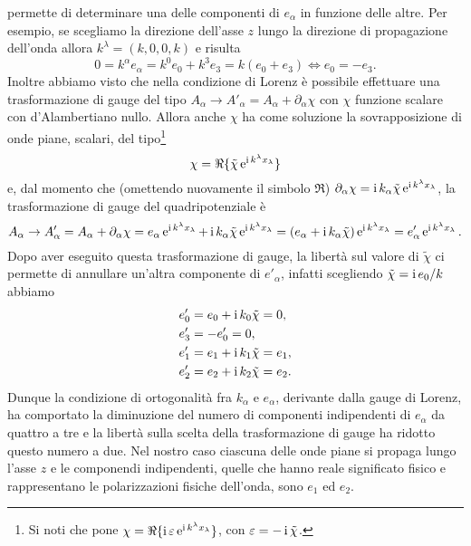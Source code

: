 permette di determinare una delle componenti di $e_{\alpha}$ in funzione delle
altre.  Per esempio, se scegliamo la direzione dell'asse $z$ lungo la direzione
di propagazione dell'onda allora $k^{\lambda} = (k, 0, 0, k)$ e risulta
\begin{equation}
  0 = k^{\alpha} e_{\alpha} = k^{0}e_{0} + k^{3}e_{3} = k(e_{0} + e_{3}) \iff
  e_{0} = -e_{3}.
\end{equation}
Inoltre abbiamo visto che nella condizione di Lorenz è possibile effettuare una
trasformazione di gauge del tipo
$A_{\alpha} \to A'_{\alpha} = A_{\alpha} + \partial_{\alpha}\chi$ con $\chi$
funzione scalare con d'Alambertiano nullo.  Allora anche $\chi$ ha come
soluzione la sovrapposizione di onde piane, scalari, del
tipo\footnote{Si noti che \textcite[258]{weinberg:gravitation} pone
  $\chi = \Re \{\operatorname{\mathrm{i}} \varepsilon\operatorname{\mathrm{e}}^{\operatorname{\mathrm{i}} k^{\lambda}x_{\lambda}}\}$, con
  $\varepsilon = -\operatorname{\mathrm{i}} \tilde{\chi}$.}
\begin{equation}
  \chi = \Re \{\tilde{\chi} \operatorname{\mathrm{e}}^{\operatorname{\mathrm{i}} k^{\lambda}x_{\lambda}}\}
\end{equation}
e, dal momento che (omettendo nuovamente il simbolo $\Re$)
$\partial_{\alpha} \chi = \operatorname{\mathrm{i}} k_{\alpha}
\tilde{\chi}\operatorname{\mathrm{e}}^{\operatorname{\mathrm{i}} k^{\lambda}x_{\lambda}}$,
la trasformazione di gauge del quadripotenziale è
\begin{equation}
  A_{\alpha} \to A'_{\alpha} = A_{\alpha} + \partial_{\alpha}\chi = e_{\alpha}
  \operatorname{\mathrm{e}}^{\operatorname{\mathrm{i}} k^{\lambda}x_{\lambda}} + \operatorname{\mathrm{i}} k_{\alpha}  \tilde{\chi}\operatorname{\mathrm{e}}^{\operatorname{\mathrm{i}}
    k^{\lambda}x_{\lambda}} = (e_{\alpha} + \operatorname{\mathrm{i}} k_{\alpha}
  \tilde{\chi})\operatorname{\mathrm{e}}^{\operatorname{\mathrm{i}} k^{\lambda}x_{\lambda}} = e'_{\alpha}\operatorname{\mathrm{e}}^{\operatorname{\mathrm{i}}
    k^{\lambda}x_{\lambda}}.
\end{equation}
Dopo aver eseguito questa trasformazione di gauge, la libertà sul valore di
$\tilde{\chi}$ ci permette di annullare un'altra componente di $e'_{\alpha}$,
infatti scegliendo $\tilde{\chi} = \operatorname{\mathrm{i}} e_{0}/k$ abbiamo
\begin{subequations}
  \begin{align}
    e'_{0} &= e_{0} + \operatorname{\mathrm{i}} k_{0} \tilde{\chi} = 0, \\
    e'_{3} &= -e'_{0} = 0, \\
    e'_{1} &= e_{1} + \operatorname{\mathrm{i}} k_{1} \tilde{\chi} = e_{1}, \\
    e'_{2} &= e_{2} + \operatorname{\mathrm{i}} k_{2} \tilde{\chi} = e_{2}.
  \end{align}
\end{subequations}
Dunque la condizione di ortogonalità fra $k_{\alpha}$ e $e_{\alpha}$, derivante
dalla gauge di Lorenz, ha comportato la diminuzione del numero di componenti
indipendenti di $e_{\alpha}$ da quattro a tre e la libertà sulla scelta della
trasformazione di gauge ha ridotto questo numero a due.  Nel nostro caso
ciascuna delle onde piane si propaga lungo l'asse $z$ e le componendi
indipendenti, quelle che hanno reale significato fisico e rappresentano le
polarizzazioni fisiche dell'onda, sono $e_{1}$ ed $e_{2}$.

